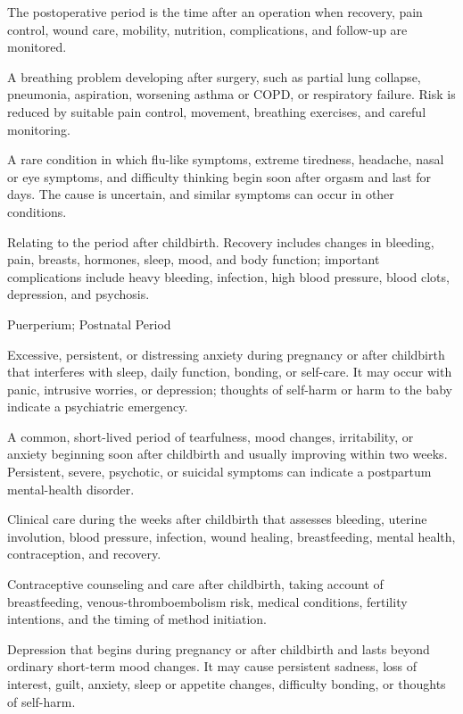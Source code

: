  The postoperative period is the time after an operation when recovery, pain control, wound care, mobility, nutrition, complications, and follow-up are monitored.

 A breathing problem developing after surgery, such as partial lung collapse, pneumonia, aspiration, worsening asthma or COPD, or respiratory failure. Risk is reduced by suitable pain control, movement, breathing exercises, and careful monitoring.

 A rare condition in which flu-like symptoms, extreme tiredness, headache, nasal or eye symptoms, and difficulty thinking begin soon after orgasm and last for days. The cause is uncertain, and similar symptoms can occur in other conditions.

 Relating to the period after childbirth. Recovery includes changes in bleeding, pain, breasts, hormones, sleep, mood, and body function; important complications include heavy bleeding, infection, high blood pressure, blood clots, depression, and psychosis.

\synonyms
Puerperium; Postnatal Period

 Excessive, persistent, or distressing anxiety during pregnancy or after childbirth that interferes with sleep, daily
function, bonding, or self-care. It may occur with panic, intrusive worries, or depression;
thoughts of self-harm or harm to the baby indicate a psychiatric emergency.

 A common, short-lived period of tearfulness, mood changes, irritability, or anxiety beginning
soon after childbirth and usually improving within two weeks. Persistent, severe, psychotic,
or suicidal symptoms can indicate a postpartum mental-health disorder.

 Clinical care during the weeks after childbirth that assesses bleeding, uterine involution, blood pressure, infection, wound healing, breastfeeding, mental health, contraception, and recovery.

 Contraceptive counseling and care after childbirth, taking account of breastfeeding, venous-thromboembolism risk, medical conditions, fertility intentions, and the timing of method initiation.

 Depression that begins during pregnancy or after childbirth and lasts beyond ordinary short-term mood changes. It may cause persistent sadness, loss of interest, guilt, anxiety, sleep or appetite changes, difficulty bonding, or thoughts of self-harm.

